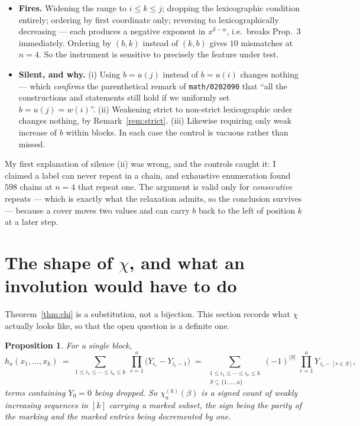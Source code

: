 \documentclass[11pt]{article}
\theoremstyle{plain}
\newtheorem{proposition}[theorem]{Proposition}
\theoremstyle{definition}
\begin{document}
\begin{itemize}
\item \textbf{Fires.} Widening the range to $i\le k\le j$; dropping the
lexicographic condition entirely; ordering by first coordinate only; reversing
to lexicographically decreasing --- each produces a negative exponent in
$x^{\delta-\alpha}$, i.e.\ breaks Prop.~3 immediately. Ordering by $(b,k)$
instead of $(k,b)$ gives $10$ mismatches at $n=4$. So the instrument is
sensitive to precisely the feature under test.
\item \textbf{Silent, and why.} (i) Using $b=u(j)$ instead of $b=u(i)$ changes
nothing --- which \emph{confirms} the parenthetical remark of
\texttt{math/0202090} that ``all the constructions and statements still hold if
we uniformly set $b=u(j)=w(i)$''. (ii) Weakening strict to non-strict
lexicographic order changes nothing, by Remark~\ref{rem:strict}. (iii) Likewise
requiring only weak increase of $b$ within blocks. In each case the control is
vacuous rather than missed.
\end{itemize}

\noindent My first explanation of silence (ii) was wrong, and the controls
caught it: I claimed a label can never repeat in a chain, and exhaustive
enumeration found $598$ chains at $n=4$ that repeat one. The argument is valid
only for \emph{consecutive} repeats --- which is exactly what the relaxation
admits, so the conclusion survives --- because a cover moves two values and can
carry $b$ back to the left of position $k$ at a later step.

\section{The shape of $\chi$, and what an involution would have to do}
\label{sec:chi-shape}

Theorem~\ref{thm:chi} is a substitution, not a bijection. This section records
what $\chi$ actually looks like, so that the open question is a definite one.

\begin{proposition}\label{prop:chi-signed}
For a single block,
\[
  h_a(x_1,\dots,x_k)\;=\;\sum_{1\le i_1\le\cdots\le i_a\le k}\ \prod_{r=1}^{a}
  \bigl(Y_{i_r}-Y_{i_r-1}\bigr)
  \;=\;\sum_{\substack{1\le i_1\le\cdots\le i_a\le k\\ S\subseteq\{1,\dots,a\}}}
  (-1)^{|S|}\;\prod_{r=1}^{a} Y_{\,i_r-[r\in S]},
\]
terms containing $Y_0=0$ being dropped. So $\chi^{(k)}_a(\beta)$ is a
\emph{signed count of weakly increasing sequences in $[k]$ carrying a marked
subset}, the sign being the parity of the marking and the marked entries being
decremented by one.
\end{proposition}
\end{document}
